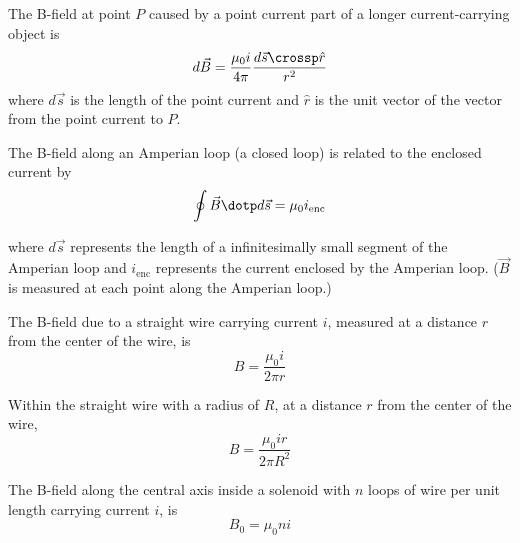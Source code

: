 \begin{namedlaw}
  The B-field at point $P$ caused by a point current part of a longer current-carrying object is
  \[
    d\vec{B} = \frac{\mu_0 i}{4 \pi} \frac{d\vec{s} \crossp \hat{r}}{r^2}
  \]
  where $d\vec{s}$ is the length of the point current and $\hat{r}$ is the unit vector of the vector from the point current to $P$.
\end{namedlaw}

\begin{namedlaw}
  The B-field along an Amperian loop (a closed loop) is related to the enclosed current by
  \[
    \oint \vec{B} \dotp d\vec{s} = \mu_0 i_{\text{enc}}
  \]

  where $d\vec{s}$ represents the length of a infinitesimally small segment of the Amperian loop and $i_{\text{enc}}$ represents the current enclosed by the Amperian loop. ($\vec{B}$ is measured at each point along the Amperian loop.)
\end{namedlaw}

\begin{example}
  The B-field due to a straight wire carrying current $i$, measured at a distance $r$ from the center of the wire, is
  \[
    B = \frac{\mu_0 i}{2 \pi r}
  \]

  Within the straight wire with a radius of $R$, at a distance $r$ from the center of the wire,
  \[
    B = \frac{\mu_0 i r}{2 \pi R^2}
  \]
\end{example}

\begin{example}
  The B-field along the central axis inside a solenoid with $n$ loops of wire per unit length carrying current $i$, is
  \[
    B_0 = \mu_0 n i
  \]
\end{example}